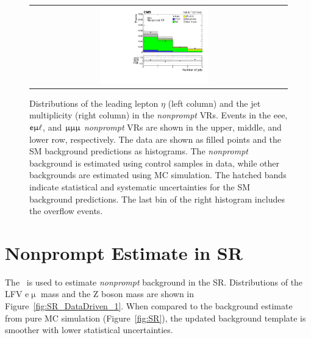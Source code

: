 \begin{figure}[tbh!]
\begin{center}
\begin{tabular}{cc}
 \includegraphics[width=0.45\textwidth]{figures/Part3/Nonprompt/VR/mumumu/njet} \\
 \end{tabular}
 \caption{Distributions of the leading lepton $\eta$ (left column) and the jet multiplicity (right column) in the \emph{nonprompt} \acp{VR}. Events in the eee, $\textsf{e}\upmu\ell$, and $\upmu\upmu\upmu$ \emph{nonprompt} \acp{VR} are shown in the upper, middle, and lower row, respectively. The data are shown as filled points and the \ac{SM} background predictions as histograms. The \emph{nonprompt} background is estimated using control samples in data, while other backgrounds are estimated using \ac{MC} simulation. The hatched bands indicate statistical and systematic uncertainties for the \ac{SM} background predictions. The last bin of the right histogram includes the overflow events.}
 \label{fig:VR_matrix}
 \end{center}
\end{figure}

\section{Nonprompt Estimate in SR}
\label{sec:MMSR}

The \mm~is used to estimate \emph{nonprompt} background in the \ac{SR}. Distributions of the LFV e$\upmu$ mass and the Z boson mass are shown in Figure~\ref{fig:SR_DataDriven_1}. When compared to the background estimate from pure \ac{MC} simulation (Figure~\ref{fig:SR}), the updated background template is smoother with lower statistical uncertainties. 

